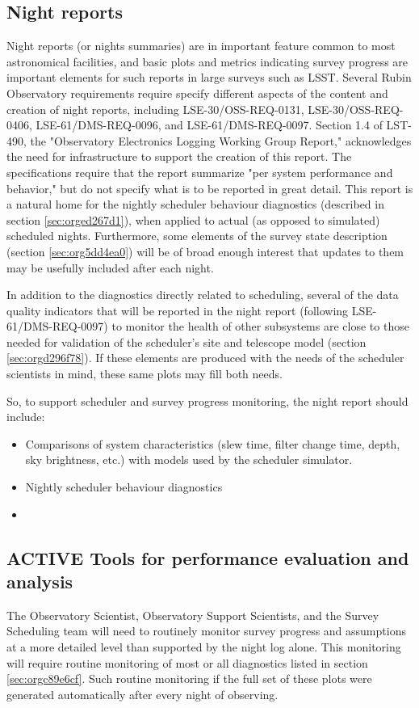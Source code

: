 \subsection{Night reports}
\label{sec:org59e9f15}
Night reports (or nights summaries) are in important feature common to most astronomical facilities, and basic plots and metrics indicating survey progress are important elements for such reports in large surveys such as LSST.
Several Rubin Observatory requirements require specify different aspects of the content and creation of night reports, including LSE-30/OSS-REQ-0131, LSE-30/OSS-REQ-0406, LSE-61/DMS-REQ-0096, and LSE-61/DMS-REQ-0097. Section 1.4 of LST-490, the "Observatory Electronics Logging Working Group Report," acknowledges the need for infrastructure to support the creation of this report.
The specifications require that the report summarize "per system performance and behavior," but do not specify what is to be reported in great detail.
This report is a natural home for the nightly scheduler behaviour diagnostics (described in section \ref{sec:orged267d1}), when applied to actual (as opposed to simulated) scheduled nights.
Furthermore, some elements of the survey state description (section \ref{sec:org5dd4ea0}) will be of broad enough interest that updates to them may be usefully included after each night.

In addition to the diagnostics directly related to scheduling, several of the data quality indicators that will be reported in the night report (following LSE-61/DMS-REQ-0097) to monitor the health of other subsystems are close to those needed for validation of the scheduler's site and telescope model (section \ref{sec:orgd296f78}). If these elements are produced with the needs of the scheduler scientists in mind, these same plots may fill both needs.

So, to support scheduler and survey progress monitoring, the night report should include:
\begin{itemize}
\item Comparisons of system characteristics (slew time, filter change time, depth, sky brightness, etc.) with models used by the scheduler simulator.
\item Nightly scheduler behaviour diagnostics
\item 
\end{itemize}

\subsection{{\bfseries\sffamily ACTIVE} Tools for performance evaluation and analysis}
\label{sec:orgf9c7497}
The Observatory Scientist, Observatory Support Scientists, and the Survey Scheduling team will need to routinely monitor survey progress and assumptions at a more detailed level than supported by the night log alone.
This monitoring will require routine monitoring of most or all diagnostics listed in section \ref{sec:orgc89e6cf}. 
Such routine monitoring if the full set of these plots were generated automatically after every night of observing. 

